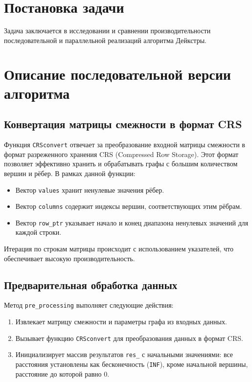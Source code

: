 \documentclass[a4paper,14pt]{extarticle}
\begin{document}
\section*{Постановка задачи}

Задача заключается в исследовании и сравнении производительности последовательной и параллельной реализаций алгоритма Дейкстры.
\section*{Описание последовательной версии алгоритма}

\subsection*{Конвертация матрицы смежности в формат CRS}

Функция \texttt{CRSconvert} отвечает за преобразование входной матрицы смежности в формат разреженного хранения CRS (Compressed Row Storage). Этот формат позволяет эффективно хранить и обрабатывать графы с большим количеством вершин и рёбер. В рамках данной функции:
\begin{itemize}
    \item Вектор \texttt{values} хранит ненулевые значения рёбер.
    \item Вектор \texttt{columns} содержит индексы вершин, соответствующих этим рёбрам.
    \item Вектор \texttt{row\_ptr} указывает начало и конец диапазона ненулевых значений для каждой строки.
\end{itemize}
Итерация по строкам матрицы происходит с использованием указателей, что обеспечивает высокую производительность.

\subsection*{Предварительная обработка данных}

Метод \texttt{pre\_processing} выполняет следующие действия:
\begin{enumerate}
    \item Извлекает матрицу смежности и параметры графа из входных данных.
    \item Вызывает функцию \texttt{CRSconvert} для преобразования данных в формат CRS.
    \item Инициализирует массив результатов \texttt{res\_} с начальными значениями: все расстояния установлены как бесконечность (\texttt{INF}), кроме начальной вершины, расстояние до которой равно 0.
\end{enumerate}
\end{document}
